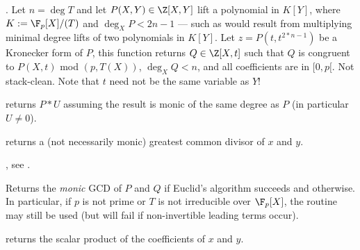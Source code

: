 . Let $n = \deg T$ and let
$P(X,Y)\in \Z[X,Y]$ lift a polynomial in $K[Y]$, where $K := \F_p[X]/(T)$ and
$\deg_X P < 2n-1$ --- such as would result from multiplying minimal degree
lifts of two polynomials in $K[Y]$. Let $z = P(t,t^{2*n-1})$ be a Kronecker
form of $P$, this function returns $Q\in \Z[X,t]$ such that $Q$ is congruent to
$P(X,t)$ mod $(p, T(X))$, $\deg_X Q < n$, and all coefficients are in $[0,p[$.
Not stack-clean. Note that $t$ need not be the same variable as $Y$!





returns $P*U$ assuming the result is monic of the same degree as $P$ (in
particular $U\neq 0$).







 returns a (not necessarily monic)
greatest common divisor of $x$  and $y$.


, see .


 Returns the \emph{monic}
GCD of $P$ and $Q$ if Euclid's algorithm succeeds and  otherwise. In
particular, if $p$ is not prime or $T$ is not irreducible over $\F_p[X]$, the
routine may still be used (but will fail if non-invertible leading terms
occur).

 returns the scalar
product of the coefficients of $x$ and $y$.

